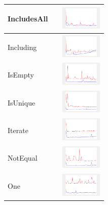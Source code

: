 \begin{longtable}{ m{2.5cm} m{8cm} m{2cm} }
IncludesAll &

&
\includegraphics[width=2cm]{../graphs/bag/small/IncludesAll}
\\\hline

Including &

&
\includegraphics[width=2cm]{../graphs/bag/small/Including}
\\\hline

IsEmpty &

&
\includegraphics[width=2cm]{../graphs/bag/small/IsEmpty}
\\\hline

IsUnique &

&
\includegraphics[width=2cm]{../graphs/bag/small/isUnique}
\\\hline

Iterate &

&
\includegraphics[width=2cm]{../graphs/bag/small/Iterate}
\\\hline

NotEqual &

&
\includegraphics[width=2cm]{../graphs/bag/small/NEQ}
\\\hline

One &

&
\includegraphics[width=2cm]{../graphs/bag/small/One}
\\\hline


\end{longtable}
